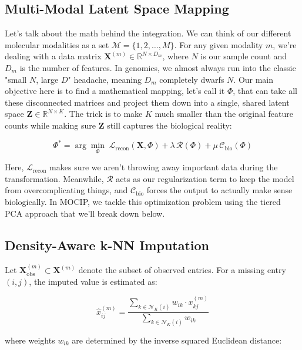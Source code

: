 \documentclass[runningheads]{llncs}
\begin{document}
\subsection{Multi-Modal Latent Space Mapping}
Let's talk about the math behind the integration. We can think of our different molecular modalities as a set $\mathcal{M} = \{1, 2, \ldots, M\}$. For any given modality $m$, we're dealing with a data matrix $\mathbf{X}^{(m)} \in \mathbb{R}^{N \times D_m}$, where $N$ is our sample count and $D_m$ is the number of features. In genomics, we almost always run into the classic "small $N$, large $D$" headache, meaning $D_m$ completely dwarfs $N$. Our main objective here is to find a mathematical mapping, let's call it $\Phi$, that can take all these disconnected matrices and project them down into a single, shared latent space $\mathbf{Z} \in \mathbb{R}^{N \times K}$. The trick is to make $K$ much smaller than the original feature counts while making sure $\mathbf{Z}$ still captures the biological reality:

\begin{equation}
\Phi^{*} = \arg\min_{\Phi} \; \mathcal{L}_{\text{recon}}(\mathbf{X}, \Phi) + \lambda \, \mathcal{R}(\Phi) + \mu \, \mathcal{C}_{\text{bio}}(\Phi)
\end{equation}

Here, $\mathcal{L}_{\text{recon}}$ makes sure we aren't throwing away important data during the transformation. Meanwhile, $\mathcal{R}$ acts as our regularization term to keep the model from overcomplicating things, and $\mathcal{C}_{\text{bio}}$ forces the output to actually make sense biologically. In MOCIP, we tackle this optimization problem using the tiered PCA approach that we'll break down below.

\subsection{Density-Aware k-NN Imputation}
Let $\mathbf{X}^{(m)}_{\text{obs}} \subset \mathbf{X}^{(m)}$ denote the subset of observed entries. For a missing entry $(i, j)$, the imputed value is estimated as:

\begin{equation}
\hat{x}^{(m)}_{ij} = \frac{\sum_{k \in \mathcal{N}_K(i)} w_{ik} \cdot x^{(m)}_{kj}}{\sum_{k \in \mathcal{N}_K(i)} w_{ik}}
\end{equation}

where weights $w_{ik}$ are determined by the inverse squared Euclidean distance:
\end{document}
